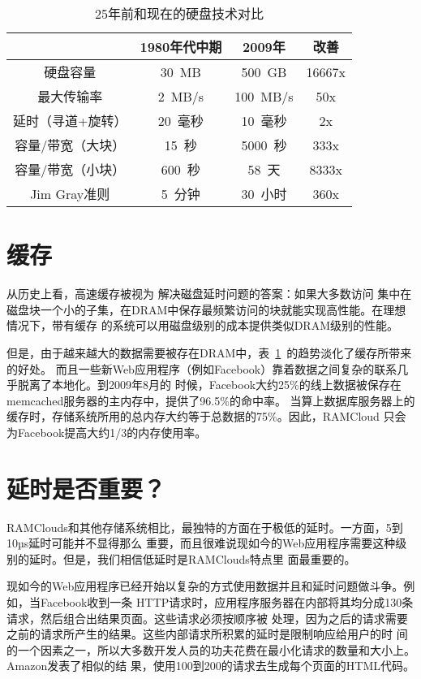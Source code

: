 \documentclass[translation]{zjutreport}
\begin{document}
\begin{table}[htbp]
\caption{25年前和现在的硬盘技术对比}\label{tab:table2}
\vspace{0.5em}
\begin{center}
{\wuhao
\begin{tabular}{cccc}
\toprule[1.5pt]
 & 1980年代中期 & 2009年 & 改善\\
\midrule[1pt]
硬盘容量 & 30~MB & 500~GB & 16667x\\
最大传输率 & 2~MB/s & 100~MB/s & 50x \\
延时（寻道+旋转）& 20~毫秒 & 10~毫秒 & 2x \\
容量/带宽（大块） & 15~秒 & 5000~秒 & 333x \\
容量/带宽（小块） & 600~秒 & 58~天 & 8333x \\
Jim Gray准则\cite{ref:11} & 5~分钟 & 30~小时 & 360x \\
\bottomrule[1.5pt]
\end{tabular}}
\end{center}
\vspace{\baselineskip}
\end{table}

\section{缓存}
从历史上看，高速缓存被视为
解决磁盘延时问题的答案：如果大多数访问
集中在磁盘块一个小的子集，在DRAM中保存最频繁访问的块就能实现高性能。在理想情况下，带有缓存
的系统可以用磁盘级别的成本提供类似DRAM级别的性能。

但是，由于越来越大的数据需要被存在DRAM中，表~\ref{tab:table2}~的趋势淡化了缓存所带来的好处。
而且一些新Web应用程序（例如Facebook）靠着数据之间复杂的联系几乎脱离了本地化。到2009年8月的
时候，Facebook大约25\%的线上数据被保存在memcached服务器的主内存中，提供了96.5\%的命中率。
当算上数据库服务器上的缓存时，存储系统所用的总内存大约等于总数据的75\%。因此，RAMCloud
只会为Facebook提高大约1/3的内存使用率。

\section{延时是否重要？}
RAMClouds和其他存储系统相比，最独特的方面在于极低的延时。一方面，5到10µs延时可能并不显得那么
重要，而且很难说现如今的Web应用程序需要这种级别的延时。但是，我们相信低延时是RAMClouds特点里
面最重要的。

现如今的Web应用程序已经开始以复杂的方式使用数据并且和延时问题做斗争。例如，当Facebook收到一条
HTTP请求时\cite{ref:13}，应用程序服务器在内部将其均分成130条请求，然后组合出结果页面。这些请求必须按顺序被
处理，因为之后的请求需要之前的请求所产生的结果。这些内部请求所积累的延时是限制响应给用户的时
间的一个因素之一，所以大多数开发人员的功夫花费在最小化请求的数量和大小上。Amazon发表了相似的结
果，使用100到200的请求去生成每个页面的HTML代码\cite{ref:8}。
\end{document}

